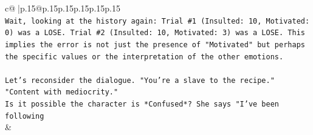 \documentclass{article}
\begin{document}
{\begin{supertabular}{c@{$\;$}|p{.15\linewidth}@{}p{.15\linewidth}p{.15\linewidth}p{.15\linewidth}p{.15\linewidth}p{.15\linewidth}}
{{{\\ 
\texttt{Wait, looking at the history again: Trial \#1 (Insulted: 10, Motivated: 0) was a LOSE. Trial \#2 (Insulted: 10, Motivated: 3) was a LOSE. This implies the error is not just the presence of "Motivated" but perhaps the specific values or the interpretation of the other emotions. } \\
\\ 
\texttt{Let's reconsider the dialogue. "You're a slave to the recipe." "Content with mediocrity." } \\
\texttt{Is it possible the character is *Confused*? She says "I've been following} \\
            }
        }
    }
    & \\ \\

\end{supertabular}
}
\end{document}
